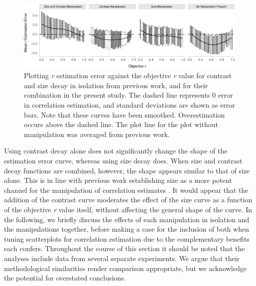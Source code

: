 \documentclass[manuscript, review, anonymous, screen]{acmart}
\begin{document}
\begin{figure}

{\centering \includegraphics[width=1\textwidth,height=\textheight]{size_and_contrast_files/figure-pdf/fig-est-multi-exp-1.pdf}

}

\caption{\label{fig-est-multi-exp}Plotting \emph{r} estimation error
against the objective \emph{r} value for contrast and size decay in
isolation from previous work, and for their combination in the present
study. The dashed line represents 0 error in correlation estimation, and
standard deviations are shown as error bars. Note that these curves have
been smoothed. Overestimation occurs above the dashed line. The plot
line for the plot without manipulation was averaged from previous work.}
\end{figure}

Using contrast decay alone does not significantly change the shape of
the estimation error curve, whereas using size decay does. When size and
contrast decay functions are combined, however, the shape appears
similar to that of size alone. This is in line with previous work
establishing size as a more potent channel for the manipulation of
correlation estimates \citep{strain_2023b}. It would appear that the
addition of the contrast curve moderates the effect of the size curve as
a function of the objective \emph{r} value itself, without affecting the
general shape of the curve. In the following, we briefly discuss the
effects of each manipulation in isolation and the manipulations
together, before making a case for the inclusion of both when tuning
scatterplots for correlation estimation due to the complementary
benefits each confers. Throughout the course of this section it should
be noted that the analyses include data from several separate
experiments. We argue that their methodological similarities render
comparison appropriate, but we acknowledge the potential for overstated
conclusions.
\end{document}
